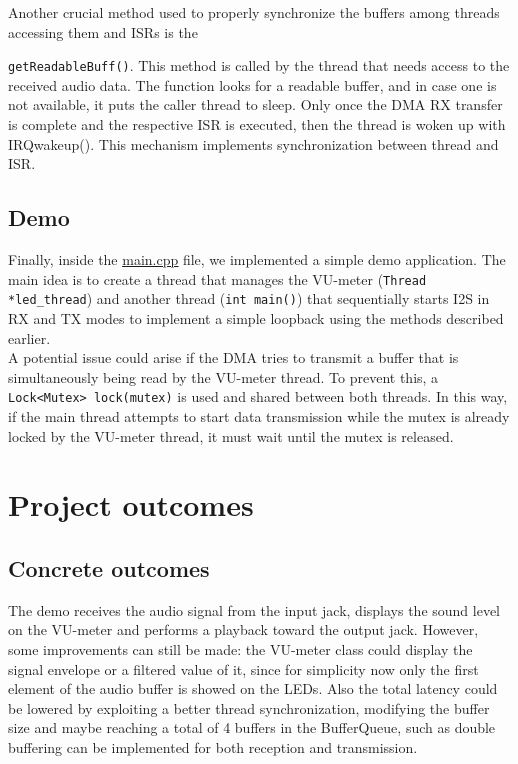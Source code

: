 \documentclass[10pt,a4]{article}
\begin{document}
Another crucial method used to properly synchronize the buffers among threads accessing them and ISRs is the \item \lstinline{getReadableBuff()}. This method is called by the thread that needs access to the received audio data. The function looks for a readable buffer, and in case one is not available, it puts the caller thread to sleep. Only once the DMA RX transfer is complete and the respective ISR is executed, then the thread is woken up with IRQwakeup(). This mechanism implements synchronization between thread and ISR.

\subsection{Demo}
Finally, inside the \href{https://github.com/AleDedor/miosix-kernel/blob/e980138e1b8862327e07b8a4abcdc5a45a58829f/main.cpp}{\underline{main.cpp}} file, we implemented a simple demo application. The main idea is to create a thread that manages the VU-meter (\lstinline{Thread *led_thread}) and another thread (\lstinline{int main()}) that sequentially starts I2S in RX and TX modes to implement a simple loopback using the methods described earlier.\\

A potential issue could arise if the DMA tries to transmit a buffer that is simultaneously being read by the VU-meter thread. To prevent this, a \lstinline{Lock<Mutex> lock(mutex)} is used and shared between both threads. In this way, if the main thread attempts to start data transmission while the mutex is already locked by the VU-meter thread, it must wait until the mutex is released.\\

\section{Project outcomes}

\subsection{Concrete outcomes}
The demo receives the audio signal from the input jack, displays the sound level on the VU-meter and performs a playback toward the output jack. However, some improvements can still be made: the VU-meter class could display the signal envelope or a filtered value of it, since for simplicity now only the first element of the audio buffer is showed on the LEDs. Also the total latency could be lowered by exploiting a better thread synchronization, modifying the buffer size and maybe reaching a total of 4 buffers in the BufferQueue, such as double buffering can be implemented for both reception and transmission.
\end{document}
